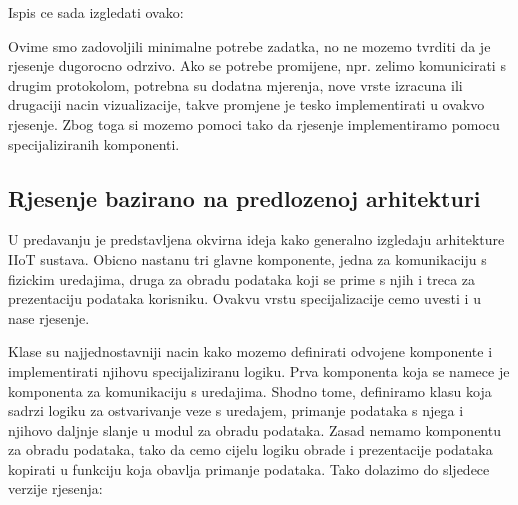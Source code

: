 \documentclass[letterpaper,10pt,croatian]{sphinxmanual}
\begin{document}
\sphinxAtStartPar
Ispis ce sada izgledati ovako:

\noindent{}

\sphinxAtStartPar
Ovime smo zadovoljili minimalne potrebe zadatka, no ne mozemo tvrditi da je
rjesenje dugorocno odrzivo. Ako se potrebe promijene, npr. zelimo komunicirati
s drugim protokolom, potrebna su dodatna mjerenja, nove vrste izracuna ili
drugaciji nacin vizualizacije, takve promjene je tesko implementirati u ovakvo
rjesenje. Zbog toga si mozemo pomoci tako da rjesenje implementiramo pomocu
specijaliziranih komponenti.


\subsection{Rjesenje bazirano na predlozenoj arhitekturi}
\label{\detokenize{01-architecture/index:rjesenje-bazirano-na-predlozenoj-arhitekturi}}
\sphinxAtStartPar
U predavanju je predstavljena okvirna ideja kako generalno izgledaju
arhitekture IIoT sustava. Obicno nastanu tri glavne komponente, jedna za
komunikaciju s fizickim uredajima, druga za obradu podataka koji se prime s
njih i treca za prezentaciju podataka korisniku. Ovakvu vrstu specijalizacije
cemo uvesti i u nase rjesenje.

\sphinxAtStartPar
Klase su najjednostavniji nacin kako mozemo definirati odvojene komponente i
implementirati njihovu specijaliziranu logiku. Prva komponenta koja se namece
je komponenta za komunikaciju s uredajima. Shodno tome, definiramo klasu
 koja sadrzi logiku za ostvarivanje veze s uredajem, primanje
podataka s njega i njihovo daljnje slanje u modul za obradu podataka. Zasad
nemamo komponentu za obradu podataka, tako da cemo cijelu logiku obrade i
prezentacije podataka kopirati u funkciju koja obavlja primanje podataka. Tako
dolazimo do sljedece verzije rjesenja:
\end{document}
